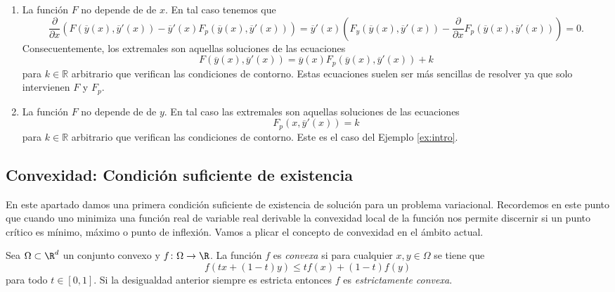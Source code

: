 \documentclass{article}
\begin{document}
\begin{enumerate}
\item La función $F$ no depende de de $x$. En tal caso tenemos que
  \[\frac{\partial}{\partial x} \left(F(\overline{y}(x), \overline{y}'(x)) - \overline{y}'(x)
      F_p(\overline{y}(x), \overline{y}'(x))\right) = \overline{y}'(x) \left(F_y(\overline{y}(x),
      \overline{y}'(x)) - \frac{\partial}{\partial x} F_p(\overline{y}(x), \overline{y}'(x))\right)
    = 0.\] Consecuentemente, los extremales son aquellas soluciones de las ecuaciones
  \begin{equation}
    \label{eq:el:x}
    F(\overline{y}(x), \overline{y}'(x)) = \overline{y}(x) F_p(\overline{y}(x), \overline{y}'(x)) + k
  \end{equation}
  para $k \in \mathbb{R}$ arbitrario que verifican las condiciones de contorno. Estas ecuaciones
  suelen ser más sencillas de resolver ya que solo intervienen $F$ y $F_p$.
\item La función $F$ no depende de de $y$. En tal caso las extremales son aquellas soluciones de las
  ecuaciones
  \begin{equation}
    \label{eq:el:y}
    F_p(x, \overline{y}'(x)) = k
  \end{equation}
  para $k \in \mathbb{R}$ arbitrario que verifican las condiciones de contorno. Este es el caso del
  Ejemplo \ref{ex:intro}.
\end{enumerate}

\subsection{Convexidad: Condición suficiente de existencia}

En este apartado damos una primera condición suficiente de existencia de solución para un problema
variacional. Recordemos en este punto que cuando uno minimiza una función real de variable real
derivable la convexidad local de la función nos permite discernir si un punto crítico es mínimo,
máximo o punto de inflexión. Vamos a plicar el concepto de convexidad en el ámbito actual.

\begin{definition}
  Sea $\Omega \subset \R^d$ un conjunto convexo y $f \colon \Omega \to \R$. La función $f$ es
  \emph{convexa} si para cualquier $x,y \in \Omega$ se tiene que
  \[ f(tx + (1-t)y) \le tf(x) + (1-t)f(y) \] para todo $t \in [0,1]$. Si la desigualdad anterior
  siempre es estricta entonces $f$ es \emph{estrictamente convexa}.
\end{definition}
\end{document}
